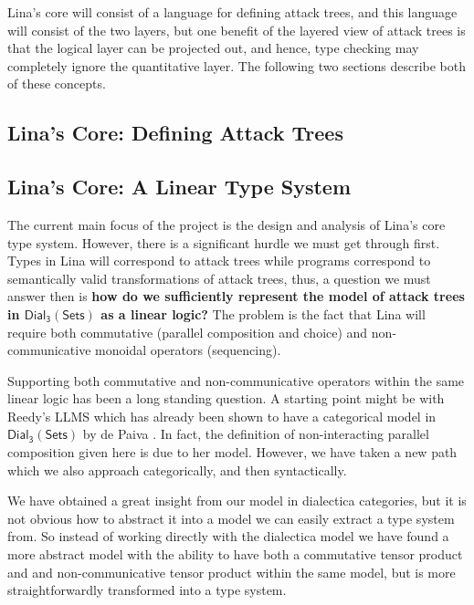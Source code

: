 \documentclass{sigplanconf}
\newcommand{\dial}[0]{\mathsf{Dial_3}(\mathsf{Sets})}
\begin{document}
Lina's core will consist of a language for defining attack trees, and
this language will consist of the two layers, but one benefit of the
layered view of attack trees is that the logical layer can be
projected out, and hence, type checking may completely ignore the
quantitative layer.  The following two sections describe both of these
concepts.

\subsection{Lina's Core: Defining Attack Trees}
\label{subsec:linas_core_defining_attack_trees}




\subsection{Lina's Core: A Linear Type System}
\label{subsec:linas_core_linear_type_system}

The current main focus of the project is the design and analysis of
Lina's core type system.  However, there is a significant hurdle we
must get through first.  Types in Lina will correspond to attack trees
while programs correspond to semantically valid transformations of
attack trees, thus, a question we must answer then is \textbf{how do
  we sufficiently represent the model of attack trees in $\dial$ as a
  linear logic?}  The problem is the fact that Lina will require both
commutative (parallel composition and choice) and non-communicative
monoidal operators (sequencing).

Supporting both commutative and non-communicative operators within the
same linear logic has been a long standing question.  A starting point
might be with Reedy's LLMS which has already been shown to have a
categorical model in $\dial$ by de Paiva \cite{dePaiva:2014a}.  In
fact, the definition of non-interacting parallel composition given
here is due to her model.  However, we have taken a new path which we
also approach categorically, and then syntactically.

We have obtained a great insight from our model in dialectica
categories, but it is not obvious how to abstract it into a model we
can easily extract a type system from.  So instead of working directly
with the dialectica model we have found a more abstract model with the
ability to have both a commutative tensor product and and
non-communicative tensor product within the same model, but is more
straightforwardly transformed into a type system.
\end{document}
